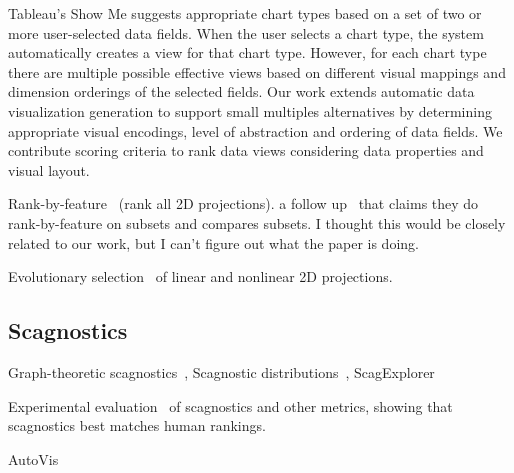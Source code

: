 Tableau's Show Me \cite{mackinlay2007} suggests appropriate chart types based on a set of two or more user-selected data fields. When the user selects a chart type, the system automatically creates a view for that chart type. However, for each chart type there are multiple possible effective views based on different visual mappings and dimension orderings of the selected fields. Our work extends automatic data visualization generation to support small multiples alternatives by determining appropriate visual encodings, level of abstraction and ordering of data fields. We contribute scoring criteria to rank data views considering data properties and visual layout.


Rank-by-feature~\cite{Seo2005} (rank all 2D projections). a follow up~\cite{Piringer2008} that claims they do rank-by-feature on subsets and compares subsets. I thought this would be closely related to our work, but I can't figure out what the paper is doing.

Evolutionary selection~\cite{Boukhelifa2013} of linear and nonlinear 2D projections.

\subsection{Scagnostics}
Graph-theoretic scagnostics~\cite{Wilkinson2005}, Scagnostic distributions~\cite{Wilkinson2008}, ScagExplorer~\cite{Dang2014}

Experimental evaluation~\cite{Lehmann2015} of scagnostics and other metrics, showing that scagnostics best matches human rankings.

AutoVis~\cite{Wills2010}

